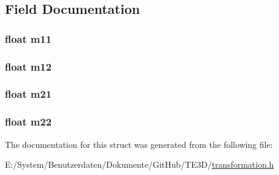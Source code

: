 \subsection{Field Documentation}
\hypertarget{struct_t_e3_d___matrix2x2f_a02c16113c6c4ce99349a1dc82bdc21cc}{
\subsubsection[{m11}]{\setlength{\rightskip}{0pt plus 5cm}float m11}}\label{struct_t_e3_d___matrix2x2f_a02c16113c6c4ce99349a1dc82bdc21cc}
\hypertarget{struct_t_e3_d___matrix2x2f_aec316cfb9b53d085372bf0cd0c769af1}{
\subsubsection[{m12}]{\setlength{\rightskip}{0pt plus 5cm}float m12}}\label{struct_t_e3_d___matrix2x2f_aec316cfb9b53d085372bf0cd0c769af1}
\hypertarget{struct_t_e3_d___matrix2x2f_a7f8222cebbd5007d7b56d367d0a6ab2a}{
\subsubsection[{m21}]{\setlength{\rightskip}{0pt plus 5cm}float m21}}\label{struct_t_e3_d___matrix2x2f_a7f8222cebbd5007d7b56d367d0a6ab2a}
\hypertarget{struct_t_e3_d___matrix2x2f_a3f6c71e06ae8d5e18af7c50f20b0acd6}{
\subsubsection[{m22}]{\setlength{\rightskip}{0pt plus 5cm}float m22}}\label{struct_t_e3_d___matrix2x2f_a3f6c71e06ae8d5e18af7c50f20b0acd6}


The documentation for this struct was generated from the following file\-:\begin{DoxyCompactItemize}
\item 
E\-:/\-System/\-Benutzerdaten/\-Dokumente/\-Git\-Hub/\-T\-E3\-D/\hyperlink{transformation_8h}{transformation.\-h}\end{DoxyCompactItemize}
